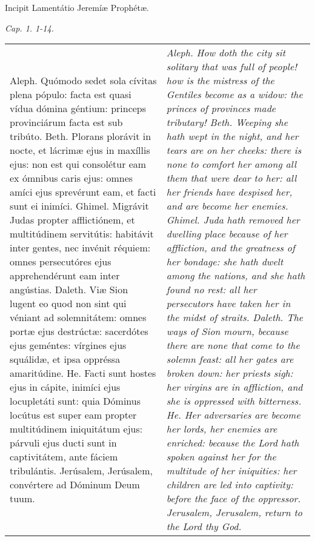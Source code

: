 \begin{center}
Incipit Lamentátio Jeremíæ Prophétæ.

\textit{\small Cap. 1. 1-14.}
\end{center}

\begin{tabular}{p{8cm} | p{8cm}}
Aleph. Quómodo sedet sola cívitas plena pópulo: facta est quasi vídua dómina géntium: princeps provinciárum facta est sub tribúto.
Beth. Plorans plorávit in nocte, et lácrimæ ejus in maxíllis ejus: non est qui consolétur eam ex ómnibus caris ejus: omnes amíci ejus sprevérunt eam, et facti sunt ei inimíci.
Ghimel. Migrávit Judas propter afflictiónem, et multitúdinem servitútis: habitávit inter gentes, nec invénit réquiem: omnes persecutóres ejus apprehendérunt eam inter angústias.
Daleth. Viæ Sion lugent eo quod non sint qui véniant ad solemnitátem: omnes portæ ejus destrúctæ: sacerdótes ejus geméntes: vírgines ejus squálidæ, et ipsa oppréssa amaritúdine.
He. Facti sunt hostes ejus in cápite, inimíci ejus locupletáti sunt: quia Dóminus locútus est super eam propter multitúdinem iniquitátum ejus: párvuli ejus ducti sunt in captivitátem, ante fáciem tribulántis.
Jerúsalem, Jerúsalem, convértere ad Dóminum Deum tuum.
& \textit{Aleph. How doth the city sit solitary that was full of people! how is the mistress of the Gentiles become as a widow: the princes of provinces made tributary!
Beth. Weeping she hath wept in the night, and her tears are on her cheeks: there is none to comfort her among all them that were dear to her: all her friends have despised her, and are become her enemies.
Ghimel. Juda hath removed her dwelling place because of her affliction, and the greatness of her bondage: she hath dwelt among the nations, and she hath found no rest: all her persecutors have taken her in the midst of straits.
Daleth. The ways of Sion mourn, because there are none that come to the solemn feast: all her gates are broken down: her priests sigh: her virgins are in affliction, and she is oppressed with bitterness.
He. Her adversaries are become her lords, her enemies are enriched: because the Lord hath spoken against her for the multitude of her iniquities: her children are led into captivity: before the face of the oppressor.
Jerusalem, Jerusalem, return to the Lord thy God.}
\end{tabular}